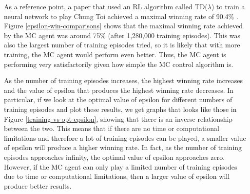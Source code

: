 \documentclass[11pt,a4paper]{report}
\begin{document}
As a reference point, a paper that used an RL algorithm called TD($\lambda$) to train a neural network to play Chung Toi achieved a maximal winning rate of 90.4\% \cite{chung-toi-params}. Figure \ref{epsilon-win-comparisons} shows that the maximal winning rate achieved by the MC agent was around 75\% (after 1,280,000 training episodes). This was also the largest number of training episodes tried, so it is likely that with more training, the MC agent would perform even better. Thus, the MC agent is performing very satisfactorily given how simple the MC control algorithm is.

As the number of training episodes increases, the highest winning rate increases and the value of epsilon that produces the highest winning rate decreases. In particular, if we look at the optimal value of epsilon for different numbers of training episodes and plot these results, we get graphs that looks like those in Figure \ref{training-vs-opt-epsilon}, showing that there is an inverse relationship between the two. This means that if there are no time or computational limitations and therefore a lot of training episodes can be played, a smaller value of epsilon will produce a higher winning rate. In fact, as the number of training episodes approaches infinity, the optimal value of epsilon approaches zero. However, if the MC agent can only play a limited number of training episodes due to time or computational limitations, then a larger value of epsilon will produce better results.
\end{document}
